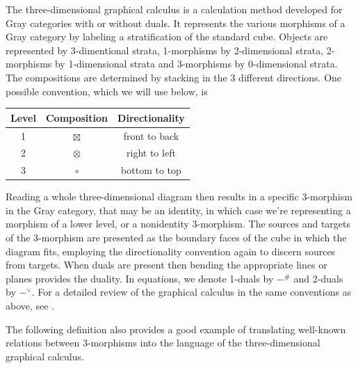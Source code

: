 \documentclass[12pt,a4paper]{article}
\numberwithin{equation}{section}
\begin{document}
The three-dimensional graphical calculus is a calculation method developed for Gray categories with or without duals. It represents the various morphisms of a Gray category by labeling a stratification of the standard cube. Objects are represented by 3-dimentional strata, 1-morphisms by 2-dimensional strata, 2-morphisms by 1-dimensional strata and 3-morphisms by 0-dimensional strata. The compositions are determined by stacking in the 3 different directions. One possible convention, which we will use below, is 
%
\begin{center}
    \begin{tabular}{c|c|c}
        Level & Composition & Directionality \\
        \hline
        1 & $\boxtimes$ & front to back \\
        2 & $\otimes$ & right to left \\
        3 & $\circ$ & bottom to top \\
    \end{tabular}
\end{center}
%
Reading a whole three-dimensional diagram then results in a specific 3-morphism in the Gray category, that may be an identity, in which case we're representing a morphism of a lower level, or a nonidentity 3-morphism. The sources and targets of the 3-morphism are presented as the boundary faces of the cube in which the diagram fits, employing the directionality convention again to discern sources from targets. When duals are present then bending the appropriate lines or planes provides the duality. In equations, we denote 1-duals by $-^\#$ and 2-duals by $-^\vee$. For a detailed review of the graphical calculus in the same conventions as above, see \cite[\S 3]{graycat}.

The following definition also provides a good example of translating well-known relations between 3-morphisms into the language of the three-dimensional graphical calculus.
\end{document}
